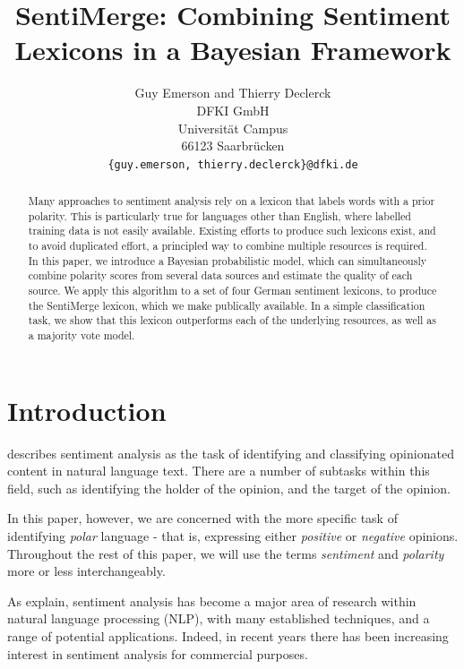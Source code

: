 \documentclass[11pt]{article}
\title{SentiMerge: Combining Sentiment Lexicons in a Bayesian Framework}
\author{Guy Emerson and Thierry Declerck \\
  DFKI GmbH \\
  Universität Campus \\
  66123 Saarbrücken \\
  {\tt \{guy.emerson, thierry.declerck\}@dfki.de} }
\date{}
\begin{document}
\maketitle

\begin{abstract}

Many approaches to sentiment analysis rely on a lexicon that labels words with a prior polarity. This is particularly true for languages other than English, where labelled training data is not easily available. Existing efforts to produce such lexicons exist, and to avoid duplicated effort, a principled way to combine multiple resources is required. In this paper, we introduce a Bayesian probabilistic model, which can simultaneously combine polarity scores from several data sources and estimate the quality of each source.  We apply this algorithm to a set of four German sentiment lexicons, to produce the SentiMerge lexicon, which we make publically available.  In a simple classification task, we show that this lexicon outperforms each of the underlying resources, as well as a majority vote model.

\end{abstract}


\section{Introduction}

 describes sentiment analysis as the task of identifying and classifying opinionated content in natural language text.  There are a number of subtasks within this field, such as identifying the holder of the opinion, and the target of the opinion.

In this paper, however, we are concerned with the more specific task of identifying \emph{polar} language - that is, expressing either \emph{positive} or \emph{negative} opinions.  Throughout the rest of this paper, we will use the terms \emph{sentiment} and \emph{polarity} more or less interchangeably.

As  explain, sentiment analysis has become a major area of research within natural language processing (NLP), with many established techniques, and a range of potential applications.  Indeed, in recent years there has been increasing interest in sentiment analysis for commercial purposes.
\end{document}
